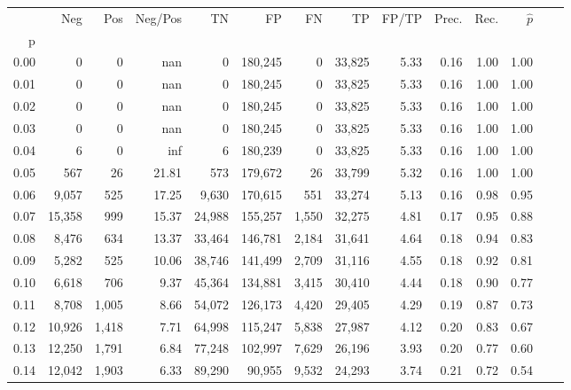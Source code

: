 \begin{tabular}{rrrrrrrrrrrrrr}
\toprule
{} &     Neg &    Pos & Neg/Pos &       TN &       FP &      FN &      TP & FP/TP & Prec. &  Rec. & $\hat{p}$ \\
p    &         &        &         &          &          &         &         &       &       &       &           \\
\midrule
0.00 &       0 &      0 &     nan &        0 &  180,245 &       0 &  33,825 &  5.33 &  0.16 &  1.00 &      1.00 \\
0.01 &       0 &      0 &     nan &        0 &  180,245 &       0 &  33,825 &  5.33 &  0.16 &  1.00 &      1.00 \\
0.02 &       0 &      0 &     nan &        0 &  180,245 &       0 &  33,825 &  5.33 &  0.16 &  1.00 &      1.00 \\
0.03 &       0 &      0 &     nan &        0 &  180,245 &       0 &  33,825 &  5.33 &  0.16 &  1.00 &      1.00 \\
0.04 &       6 &      0 &     inf &        6 &  180,239 &       0 &  33,825 &  5.33 &  0.16 &  1.00 &      1.00 \\
0.05 &     567 &     26 &   21.81 &      573 &  179,672 &      26 &  33,799 &  5.32 &  0.16 &  1.00 &      1.00 \\
0.06 &   9,057 &    525 &   17.25 &    9,630 &  170,615 &     551 &  33,274 &  5.13 &  0.16 &  0.98 &      0.95 \\
0.07 &  15,358 &    999 &   15.37 &   24,988 &  155,257 &   1,550 &  32,275 &  4.81 &  0.17 &  0.95 &      0.88 \\
0.08 &   8,476 &    634 &   13.37 &   33,464 &  146,781 &   2,184 &  31,641 &  4.64 &  0.18 &  0.94 &      0.83 \\
0.09 &   5,282 &    525 &   10.06 &   38,746 &  141,499 &   2,709 &  31,116 &  4.55 &  0.18 &  0.92 &      0.81 \\
0.10 &   6,618 &    706 &    9.37 &   45,364 &  134,881 &   3,415 &  30,410 &  4.44 &  0.18 &  0.90 &      0.77 \\
0.11 &   8,708 &  1,005 &    8.66 &   54,072 &  126,173 &   4,420 &  29,405 &  4.29 &  0.19 &  0.87 &      0.73 \\
0.12 &  10,926 &  1,418 &    7.71 &   64,998 &  115,247 &   5,838 &  27,987 &  4.12 &  0.20 &  0.83 &      0.67 \\
0.13 &  12,250 &  1,791 &    6.84 &   77,248 &  102,997 &   7,629 &  26,196 &  3.93 &  0.20 &  0.77 &      0.60 \\
0.14 &  12,042 &  1,903 &    6.33 &   89,290 &   90,955 &   9,532 &  24,293 &  3.74 &  0.21 &  0.72 &      0.54 \\

\end{tabular}
